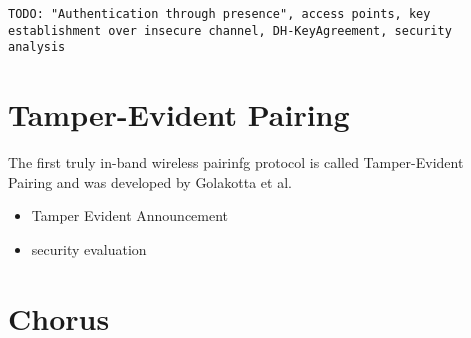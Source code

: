 \documentclass[conference]{IEEEtran}
\begin{document}
\texttt{TODO: "Authentication through presence", access points, key establishment over insecure channel, DH-KeyAgreement, security analysis}

\section{Tamper-Evident Pairing}

The first truly in-band wireless pairinfg protocol is called Tamper-Evident Pairing and was developed by Golakotta et al.
\begin{itemize}
    \item Tamper Evident Announcement
    \item security evaluation 
\end{itemize}

\section{Chorus}
\end{document}
